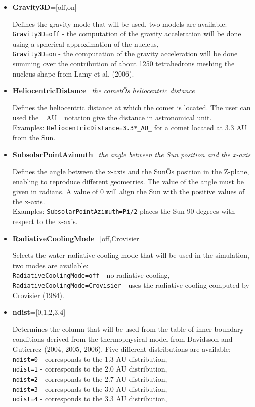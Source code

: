 \begin{itemize}

\item {\bf Gravity3D}=[off,on] 

Defines the gravity mode that will be used, two models are available:
\\{\tt Gravity3D=off} - the computation of the gravity acceleration will be done using a spherical approximation of the nucleus,
\\{\tt Gravity3D=on} - the computation of the gravity acceleration will be done summing over the contribution of about 1250 tetrahedrons meshing the nucleus shape from Lamy et al. (2006).

\item {\bf HeliocentricDistance}={\it the cometÕs heliocentric distance}

Defines the heliocentric distance at which the comet is located. The user can used the \_AU\_ notation give the distance in astronomical unit.
\\Examples: {\tt HeliocentricDistance=3.3*\_AU\_} for a comet located at 3.3 AU from the Sun.

\item {\bf SubsolarPointAzimuth}={\it the angle between the Sun position and the x-axis}

Defines the angle between the x-axis and the SunÕs position in the Z-plane, enabling to reproduce different geometries. The value of the angle must be given in radians. A value of 0 will align the Sun with the positive values of the x-axis. 
\\Examples: {\tt SubsolarPointAzimuth=Pi/2} places the Sun 90 degrees with respect to the x-axis. 

\item {\bf RadiativeCoolingMode}=[off,Crovisier]

Selects the water radiative cooling mode that will be used in the simulation, two modes are available:
\\{\tt RadiativeCoolingMode=off} - no radiative cooling,
\\{\tt RadiativeCoolingMode=Crovisier} - uses the radiative cooling computed by Crovisier (1984).

\item {\bf ndist}=[0,1,2,3,4]

Determines the column that will be used from the table of inner boundary conditions derived from the thermophysical model from Davidsson and Gutierrez (2004, 2005, 2006). Five different distributions are available:
\\{\tt ndist=0} - corresponds to the 1.3 AU distribution,
\\{\tt ndist=1} - corresponds to the 2.0 AU distribution,
\\{\tt ndist=2} - corresponds to the 2.7 AU distribution,
\\{\tt ndist=3} - corresponds to the 3.0 AU distribution,
\\{\tt ndist=4} - corresponds to the 3.3 AU distribution,


\end{itemize}
